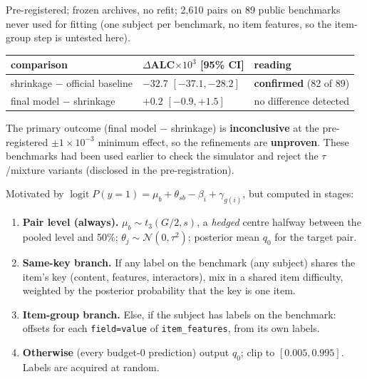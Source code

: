 \documentclass{article}
\newcommand{\ee}[1]{\times10^{-#1}}
\newcommand{\bodysize}{22}\newcommand{\bodyskip}{27}
\begin{document}
\begin{minipage}[t]{0.488\linewidth}
\begin{tcolorbox}[block, title={Result 2: shrinkage holds on 89 unseen benchmarks}]
Pre-registered; frozen archives, no refit; 2{,}610 pairs on 89 public benchmarks never used for fitting (one subject
per benchmark, no item features, so the item-group step is untested here).
\begin{center}\fontsize{\bodysize}{\bodyskip}\selectfont
\begin{tabular}{@{}lll@{}}
\toprule
comparison & $\Delta$ALC$\times10^{3}$ [95\% CI] & reading\\
\midrule
shrinkage $-$ official baseline & $-32.7$ \;$[-37.1,-28.2]$ & \textbf{confirmed} (82 of 89)\\
final model $-$ shrinkage & $+0.2$ \;$[-0.9,+1.5]$ & no difference detected\\
\bottomrule
\end{tabular}\end{center}
The primary outcome (final model $-$ shrinkage) is \textbf{inconclusive} at the pre-registered $\pm1\ee{3}$ minimum
effect, so the refinements are \textbf{unproven}. These benchmarks had been used earlier to check the simulator and
reject the $\tau$/mixture variants (disclosed in the pre-registration).
\end{tcolorbox}

\begin{tcolorbox}[block, title={The model (pure Python + NumPy, 5\,KB zipped)}]
Motivated by $\operatorname{logit}P(y{=}1)=\mu_b+\theta_{sb}-\beta_i+\gamma_{g(i)}$, but computed in stages:
\begin{enumerate}
\item \textbf{Pair level (always).} $\mu_b\sim t_3(G/2,s)$, a \emph{hedged} centre halfway between the pooled level
  and 50\%; $\theta_j\sim\mathcal N(0,\tau^2)$; posterior mean $q_0$ for the target pair.
\item \textbf{Same-key branch.} If any label on the benchmark (any subject) shares the item's key (content, features,
  interactors), mix in a shared item difficulty, weighted by the posterior probability that the key is one item.
\item \textbf{Item-group branch.} Else, if the subject has labels on the benchmark: offsets for each
  \texttt{field=value} of \texttt{item\_features}, from its own labels.
\item \textbf{Otherwise} (every budget-0 prediction) output $q_0$; clip to $[0.005,0.995]$. Labels are acquired at
  random.
\end{enumerate}
\end{tcolorbox}


\end{minipage}
\end{document}
